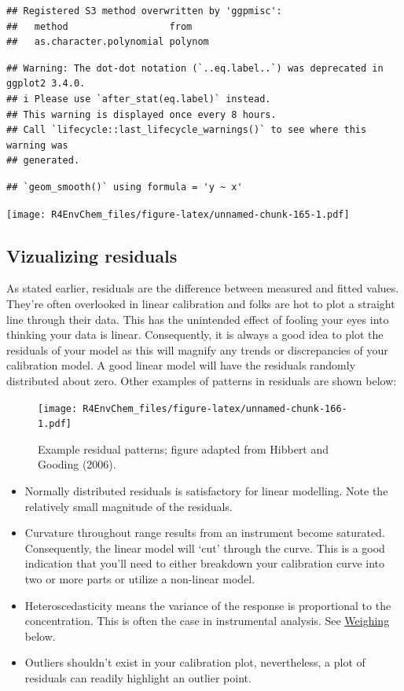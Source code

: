 \documentclass[
]{book}
\providecommand{\tightlist}{%
  \setlength{\itemsep}{0pt}\setlength{\parskip}{0pt}}
\begin{document}
\begin{verbatim}
## Registered S3 method overwritten by 'ggpmisc':
##   method                  from   
##   as.character.polynomial polynom
\end{verbatim}

\begin{verbatim}
## Warning: The dot-dot notation (`..eq.label..`) was deprecated in ggplot2 3.4.0.
## i Please use `after_stat(eq.label)` instead.
## This warning is displayed once every 8 hours.
## Call `lifecycle::last_lifecycle_warnings()` to see where this warning was
## generated.
\end{verbatim}

\begin{verbatim}
## `geom_smooth()` using formula = 'y ~ x'
\end{verbatim}

\texttt{[image: R4EnvChem\_files/figure-latex/unnamed-chunk-165-1.pdf]}

\hypertarget{vizualizing-residuals}{%
\subsection{Vizualizing residuals}\label{vizualizing-residuals}}

As stated earlier, residuals are the difference between measured and fitted values. They're often overlooked in linear calibration and folks are hot to plot a straight line through their data. This has the unintended effect of fooling your eyes into thinking your data is linear. Consequently, it is always a good idea to plot the residuals of your model as this will magnify any trends or discrepancies of your calibration model. A good linear model will have the residuals randomly distributed about zero. Other examples of patterns in residuals are shown below:

\begin{figure}
\centering
\texttt{[image: R4EnvChem\_files/figure-latex/unnamed-chunk-166-1.pdf]}
\caption{\label{fig:unnamed-chunk-166}Example residual patterns; figure adapted from Hibbert and Gooding (2006).}
\end{figure}

\begin{itemize}
\tightlist
\item
  Normally distributed residuals is satisfactory for linear modelling. Note the relatively small magnitude of the residuals.
\item
  Curvature throughout range results from an instrument become saturated. Consequently, the linear model will `cut' through the curve. This is a good indication that you'll need to either breakdown your calibration curve into two or more parts or utilize a non-linear model.
\item
  Heteroscedasticity means the variance of the response is proportional to the concentration. This is often the case in instrumental analysis. See \protect\hyperlink{weighing}{Weighing} below.
\item
  Outliers shouldn't exist in your calibration plot, nevertheless, a plot of residuals can readily highlight an outlier point.
\end{itemize}
\end{document}
